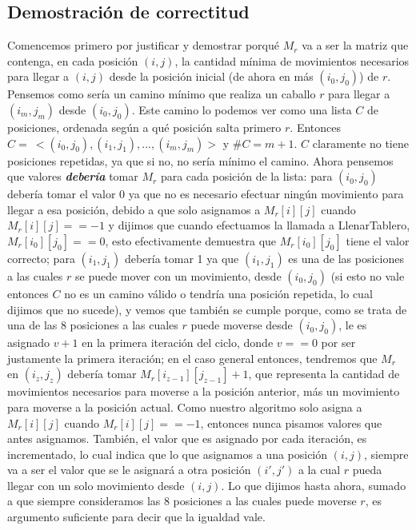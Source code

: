 \documentclass[a4paper]{article}
\begin{document}
\subsection{Demostración de correctitud}
Comencemos primero por justificar y demostrar porqué $M_r$ va a ser la matriz que contenga, en cada posición $(i, j)$, la cantidad mínima de movimientos necesarios para llegar a $(i, j)$ desde la posición inicial (de ahora en más $(i_0, j_0)$) de $r$.
Pensemos como sería un camino mínimo que realiza un caballo $r$ para llegar a $(i_m, j_m)$ desde $(i_0, j_0)$. Este camino lo podemos ver como una lista $C$ de posiciones, ordenada según a qué posición salta primero $r$. Entonces $C = \ <(i_0, j_0), (i_1, j_1), ... , (i_m, j_m)>$ y $\#C = m + 1$. $C$ claramente no tiene posiciones repetidas, ya que si no, no sería mínimo el camino. Ahora pensemos que valores \textit{\textbf{debería}} tomar $M_r$ para cada posición de la lista: para $(i_0, j_0)$ debería tomar el valor 0 ya que no es necesario efectuar ningún movimiento para llegar a esa posición, debido a que solo asignamos a $M_r[i][j]$ cuando $M_r[i][j] == -1$ y dijimos que cuando efectuamos la llamada a LlenarTablero, $M_r[i_0][j_0] == 0$, esto efectivamente demuestra que $M_r[i_0][j_0]$ tiene el valor correcto; para $(i_1, j_1)$ debería tomar 1 ya que $(i_1, j_1)$ es una de las posiciones a las cuales $r$ se puede mover con un movimiento, desde $(i_0, j_0)$ (si esto no vale entonces $C$ no es un camino válido o tendría una posición repetida, lo cual dijimos que no sucede), y vemos que también se cumple porque, como se trata de una de las 8 posiciones a las cuales $r$ puede moverse desde $(i_0, j_0)$, le es asignado $v + 1$ en la primera iteración del ciclo, donde $v == 0$ por ser justamente la primera iteración; en el caso general entonces, tendremos que $M_r$ en $(i_z, j_z)$ debería tomar $M_r[i_{z-1}][j_{z-1}] + 1$, que representa la cantidad de movimientos necesarios para moverse a la posición anterior, más un movimiento para moverse a la posición actual. Como nuestro algoritmo solo asigna a $M_r[i][j]$ cuando $M_r[i][j] == -1$, entonces nunca pisamos valores que antes asignamos. También, el valor que es asignado por cada iteración, es incrementado, lo cual indica que lo que asignamos a una posición $(i, j)$, siempre va a ser el valor que se le asignará a otra posición $(i', j')$ a la cual $r$ pueda llegar con un solo movimiento desde $(i, j)$. Lo que dijimos hasta ahora, sumado a que siempre consideramos las 8 posiciones a las cuales puede moverse $r$, es argumento suficiente para decir que la igualdad vale.
\end{document}
